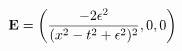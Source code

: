 \begin{equation}
   {\bf E} = \left(\frac{-2\epsilon^2}{(x^2 - t^2 +\epsilon^2)^2},0,0\right)
   \label{electricfield}
   \end{equation}

